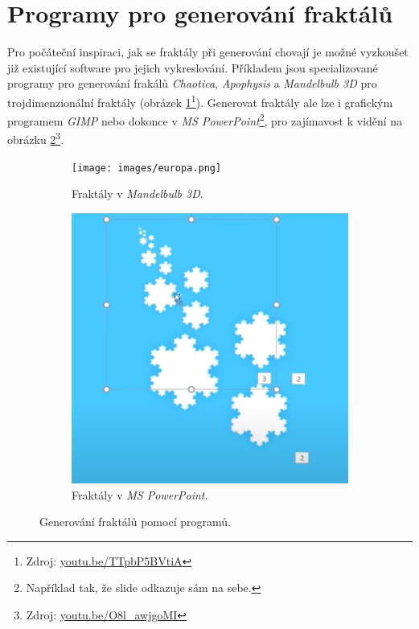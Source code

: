 \documentclass[thesis=B, czech]{FITthesis}[2019/03/06]
\begin{document}

\section{Programy pro generování fraktálů}

Pro počáteční inspiraci, jak se fraktály při generování chovají je možné vyzkoušet již existující software pro jejich vykreslování. Příkladem jsou specializované programy pro generování frakálů \textit{Chaotica}, \textit{Apophysis} a \textit{Mandelbulb 3D} pro trojdimenzionální fraktály (obrázek \ref{fig:mandelbulb}\footnote{Zdroj: \url{youtu.be/TTpbP5BVtiA}}). Generovat fraktály ale lze i grafickým programem \textit{GIMP} nebo dokonce v\textit{ MS PowerPoint}\footnote{Například tak, že slide odkazuje sám na sebe.}, pro zajímavost k vidění na obrázku \ref{fig:powerpoint}\footnote{Zdroj: \url{youtu.be/O8l_awjgoMI}}. 



\begin{figure}[h]
\centering
  \begin{subfigure}{0.55\textwidth}
    \texttt{[image: images/europa.png]}
    \caption{Fraktály v \textit{Mandelbulb 3D}.}
    \label{fig:mandelbulb}
  \end{subfigure}
  \hspace{1pt}
  \begin{subfigure}{0.4\textwidth}
    \includegraphics[width=\textwidth]{images/powerpoint.png}
    \caption{Fraktály v \textit{MS PowerPoint}.}
    \label{fig:powerpoint}
  \end{subfigure}
  
   
    \caption{ \label{fig:fractalPrograms}Generování fraktálů pomocí programů.}
\end{figure}
\end{document}
